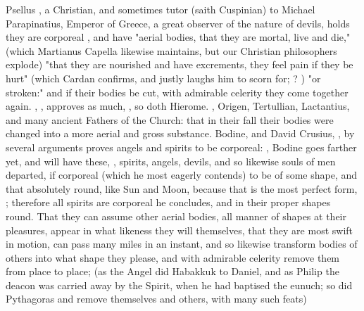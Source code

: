 Psellus , a Christian, and sometimes tutor (saith
Cuspinian) to Michael Parapinatius, Emperor of Greece, a great observer of the
nature of devils, holds they are corporeal , and have
"aerial bodies, that they are mortal, live and die," (which Martianus Capella
likewise maintains, but our Christian philosophers explode) "that they
are nourished and have excrements, they feel pain if they
be hurt" (which Cardan confirms, and \Scaliger{} justly laughs him to scorn for;
? \etc{}) "or stroken:"
and if their bodies be cut, with admirable celerity they come together again.
\Austin{}, , approves as much,
, so doth
Hierome. , Origen,
Tertullian, Lactantius, and many ancient Fathers of the Church: that in their
fall their bodies were changed into a more aerial and gross substance. Bodine,
 and David Crusius,
, by several
arguments proves angels and spirits to be corporeal: , \etc{} Bodine goes farther
yet, and will have these, , spirits, angels, devils,
and so likewise souls of men departed, if corporeal (which he most eagerly
contends) to be of some shape, and that absolutely round, like Sun and Moon,
because that is the most perfect form, ; therefore all spirits are
corporeal he concludes, and in their proper shapes round. That they can assume
other aerial bodies, all manner of shapes at their pleasures, appear in what
likeness they will themselves, that they are most swift in motion, can pass
many miles in an instant, and so likewise transform bodies
of others into what shape they please, and with admirable celerity remove them
from place to place; (as the Angel did Habakkuk to Daniel, and as Philip the
deacon was carried away by the Spirit, when he had baptised the eunuch; so did
Pythagoras and \Apollonius{} remove themselves and others, with many such feats)
